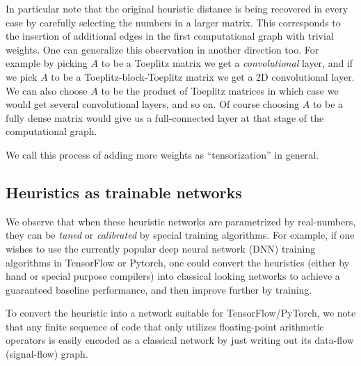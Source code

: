 \documentclass{article}
\begin{document}
In particular note that the original heuristic distance is being recovered in every case by carefully selecting the numbers in a larger matrix. This corresponds to the insertion of additional edges in the first computational graph with trivial weights. One can generalize this observation in another direction too. For example by picking $A$ to be a Toeplitz matrix we get a \textit{convolutional} layer, and if we pick $A$ to be a Toeplitz-block-Toeplitz matrix we get a 2D convolutional layer. We can also choose $A$ to be the product of Toeplitz matrices in which case we would get several convolutional layers, and so on. Of course choosing $A$ to be a fully dense matrix would give us a full-connected layer at that stage of the computational graph.


We call this process of adding more weights as ``tensorization'' in general.

\vspace{-2mm}
\subsection*{Heuristics as trainable networks}
\vspace{-2mm}
We observe that when these heuristic networks are parametrized by real-numbers, they can be \textit{tuned} or \textit{calibrated} by special training algorithms. For example, if one wishes to use the currently popular deep neural network (DNN) training algorithms in TensorFlow or Pytorch, one could convert the heuristics (either by hand or special purpose compilers) into classical looking networks to achieve a guaranteed baseline performance, and then improve further by training.

To convert the heuristic into a network suitable for TensorFlow/PyTorch, we note that any finite sequence of code that only utilizes floating-point arithmetic operators is easily encoded as a classical network by just writing out its data-flow (signal-flow) graph.
\end{document}
